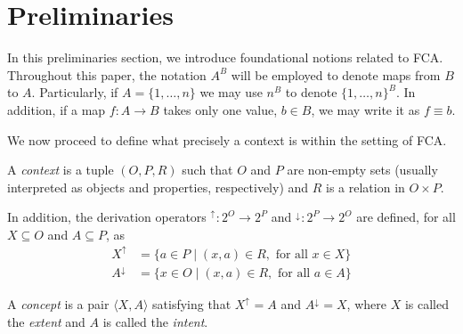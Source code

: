 \documentclass[runningheads,a4paper]{llncs}
\newcommand{\calC}{\mathcal C}
\newcommand{\up}[1][]{{^{\uparrow_{#1}}}}
\newcommand{\down}[1][]{{^{\downarrow^{#1}}}}
\newcommand{\cred}[1]{{\color{red} #1}}
\begin{document}
\section{Preliminaries}\label{sec:preliminaries}

In this preliminaries section, we introduce foundational notions related to FCA. Throughout this paper, the notation $A^B$ will be employed to denote maps from $B$ to $A$. Particularly, if $A = \{1, \dots, n\}$ we may use $n^B$ to denote $\{1, \dots, n\}^B$. In addition, if a map $f \colon A \to B$ takes only one value, $b \in B$, we may write it as $f \equiv b$. 

We now proceed to define what precisely a context is within the setting of FCA.

\begin{definition}

A \emph{context} is a tuple $(O, P, R)$ such that $O$ and $P$ are non-empty sets (usually interpreted as objects and properties, respectively) and $R$ is a relation in $O \times P$.

\end{definition}

In addition, the derivation operators $\up \colon 2^O \to 2^P$ and $\down \colon 2^P \to 2^O$ are defined, for all $X \subseteq O$ and $A \subseteq P$, as
\begin{align*}
	X\up &= \{a \in P \mid (x, a) \in R, \text{ for all $x \in X$}\} \\
	A\down &= \{x \in O \mid (x, a) \in R, \text{ for all $a \in A$}\}
\end{align*}

A \emph{concept} is a pair $\langle X, A \rangle$ satisfying that $X\up = A$ and $A\down = X$, where $X$ is called the \emph{extent} and $A$ is called the \emph{intent}. %


	
\end{document}
